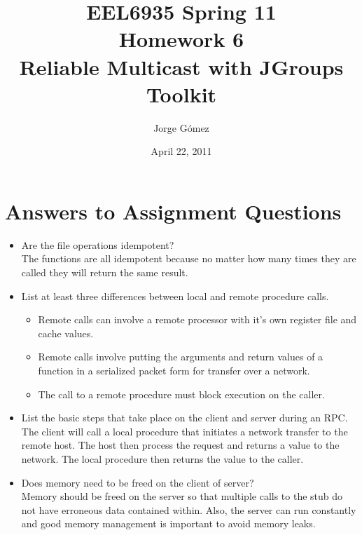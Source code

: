\documentclass{article}
\title{EEL6935 Spring 11\\Homework 6\\Reliable Multicast with JGroups Toolkit}
\date{April 22, 2011}
\author{Jorge G\'omez}
\begin{document}
\maketitle
\section{Answers to Assignment Questions}
  \begin{itemize}
    \item Are the file operations idempotent?\\
      The functions are all idempotent because no matter how many times they are
      called they will return the same result.
    \item List at least three differences between local and remote procedure calls.
	\begin{itemize}
          \item Remote calls can involve a remote processor with it's own register file
            and cache values.
          \item Remote calls involve putting the arguments and return values of a function
            in a serialized packet form for transfer over a network.
          \item The call to a remote procedure must block execution on the caller.
        \end{itemize}
    \item List the basic steps that take place on the client and server during an RPC.\\
      The client will call a local procedure that initiates a network transfer to the remote
      host. The host then process the request and returns a value to the network. The local
      procedure then returns the value to the caller.
    \item Does memory need to be freed on the client of server?\\
      Memory should be freed on the server so that multiple calls to the stub do not have
      erroneous data contained within. Also, the server can run constantly and good memory
      management is important to avoid memory leaks.
  \end{itemize}
\end{document}
